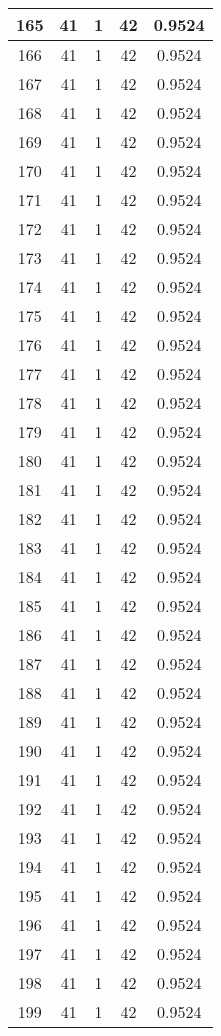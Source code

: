 \documentclass[letterpaper, 12pt]{article}
\begin{document}
\begin{longtable}{|c|c|c|c|c|}
\hline
165 & 41 & 1 & 42 & 0.9524 \\
\hline
166 & 41 & 1 & 42 & 0.9524 \\
\hline
167 & 41 & 1 & 42 & 0.9524 \\
\hline
168 & 41 & 1 & 42 & 0.9524 \\
\hline
169 & 41 & 1 & 42 & 0.9524 \\
\hline
170 & 41 & 1 & 42 & 0.9524 \\
\hline
171 & 41 & 1 & 42 & 0.9524 \\
\hline
172 & 41 & 1 & 42 & 0.9524 \\
\hline
173 & 41 & 1 & 42 & 0.9524 \\
\hline
174 & 41 & 1 & 42 & 0.9524 \\
\hline
175 & 41 & 1 & 42 & 0.9524 \\
\hline
176 & 41 & 1 & 42 & 0.9524 \\
\hline
177 & 41 & 1 & 42 & 0.9524 \\
\hline
178 & 41 & 1 & 42 & 0.9524 \\
\hline
179 & 41 & 1 & 42 & 0.9524 \\
\hline
180 & 41 & 1 & 42 & 0.9524 \\
\hline
181 & 41 & 1 & 42 & 0.9524 \\
\hline
182 & 41 & 1 & 42 & 0.9524 \\
\hline
183 & 41 & 1 & 42 & 0.9524 \\
\hline
184 & 41 & 1 & 42 & 0.9524 \\
\hline
185 & 41 & 1 & 42 & 0.9524 \\
\hline
186 & 41 & 1 & 42 & 0.9524 \\
\hline
187 & 41 & 1 & 42 & 0.9524 \\
\hline
188 & 41 & 1 & 42 & 0.9524 \\
\hline
189 & 41 & 1 & 42 & 0.9524 \\
\hline
190 & 41 & 1 & 42 & 0.9524 \\
\hline
191 & 41 & 1 & 42 & 0.9524 \\
\hline
192 & 41 & 1 & 42 & 0.9524 \\
\hline
193 & 41 & 1 & 42 & 0.9524 \\
\hline
194 & 41 & 1 & 42 & 0.9524 \\
\hline
195 & 41 & 1 & 42 & 0.9524 \\
\hline
196 & 41 & 1 & 42 & 0.9524 \\
\hline
197 & 41 & 1 & 42 & 0.9524 \\
\hline
198 & 41 & 1 & 42 & 0.9524 \\
\hline
199 & 41 & 1 & 42 & 0.9524 \\
\hline
\end{longtable}
\end{document}
